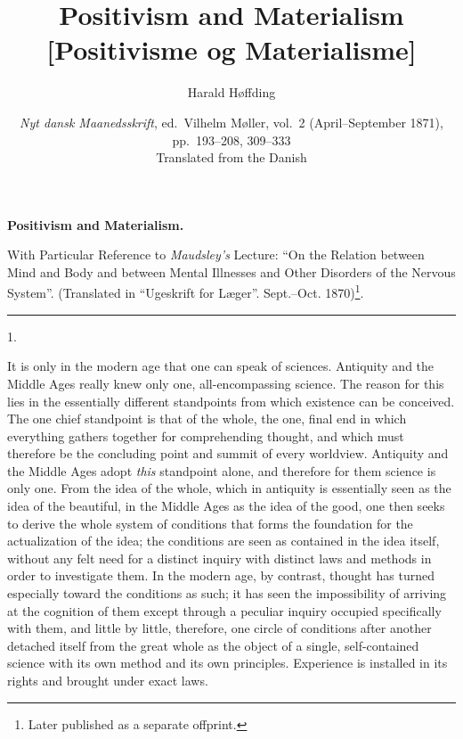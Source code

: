 \documentclass[12pt,a4paper,openany]{book}
\title{\textbf{Positivism and Materialism}\\[8pt]
  \large [Positivisme og Materialisme]}
\author{Harald Høffding}
\date{\textit{Nyt dansk Maanedsskrift}, ed.\ Vilhelm Møller, vol.~2
  (April--September 1871), pp.~193--208, 309--333\\[10pt]
  \small Translated from the Danish}
\newcommand{\secnum}[1]{\par\begin{center}#1\end{center}\par\nobreak}
\newcommand{\opage}[1]{\marginnote{\footnotesize\textit{[#1]}}}
\begin{document}
\maketitle
\thispagestyle{empty}
\clearpage

\opage{193}\begin{center}\textbf{\large Positivism and Materialism.}\end{center}

{\small With Particular Reference to \emph{Maudsley's} Lecture: ``On the Relation between Mind and Body and between Mental Illnesses and Other Disorders of the Nervous System''. (Translated in ``Ugeskrift for Læger''. Sept.--Oct. 1870)\footnote{Later published as a separate offprint.}.\par}

\begin{center}\rule{1.8cm}{0.4pt}\end{center}

\secnum{1.}

It is only in the modern age that one can speak of sciences.
Antiquity and the Middle Ages really knew only one,
all-encompassing science. The reason for this lies in the essentially
different standpoints from which existence can be conceived.
The one chief standpoint is that of the whole, the one, final end
in which everything gathers together for comprehending thought, and
which must therefore be the concluding point and summit of every
worldview. Antiquity and the Middle Ages adopt \emph{this}
standpoint alone, and therefore for them science is only
one. From the idea of the whole, which in antiquity is essentially seen as
the idea of the beautiful, in the Middle Ages as the idea of the good,
one then seeks to derive the whole system of conditions that
forms the foundation for the actualization of the idea; the conditions
are seen as contained in the idea itself, without any felt need for
a distinct inquiry with distinct laws and methods in order to
investigate them. In the modern age, by contrast, thought has
turned especially toward the conditions as such; it has
\opage{194}seen the impossibility of arriving at the cognition of them except
through a peculiar inquiry occupied specifically with them,
and little by little, therefore, one circle of conditions after
another detached itself from the great whole as the object of a
single, self-contained science with its own method and its own principles.
Experience is installed in its rights and brought under
exact laws.
\end{document}
